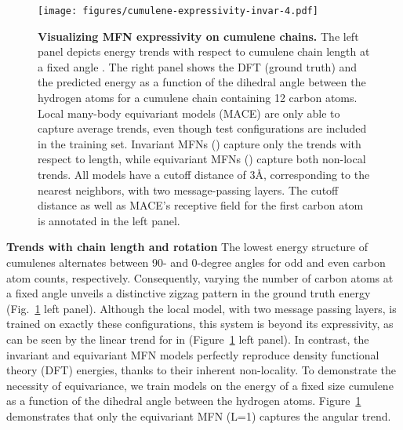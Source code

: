 \documentclass{article} \usepackage{iclr2024_conference,times}
\begin{document}
\begin{figure}[h!]
    \centering
    \vspace{-7pt}
    \texttt{[image: figures/cumulene-expressivity-invar-4.pdf]}
	\caption{\textbf{Visualizing MFN expressivity on cumulene chains.} The left panel depicts energy trends with respect to cumulene chain length at a fixed angle . The right panel shows the DFT (ground truth) and the predicted energy as a function of the dihedral angle  between the hydrogen atoms for a cumulene chain containing 12 carbon atoms. Local many-body equivariant models (MACE) are only able to capture average trends, even though test configurations are included in the training set. Invariant MFNs () capture only the trends with respect to length, while equivariant MFNs () capture both non-local trends. All models have a cutoff distance  of 3\AA{}, corresponding to the nearest neighbors, with two message-passing layers. The cutoff distance as well as MACE's receptive field for the first carbon atom is annotated in the left panel.}
    \label{fig:cumulenes-combined}
\end{figure}
\textbf{Trends with chain length and rotation}
The lowest energy structure of cumulenes alternates between 90- and 0-degree angles for odd and even carbon atom counts, respectively. Consequently, varying the number of carbon atoms at a fixed angle unveils a distinctive zigzag pattern in the ground truth energy (Fig.~\ref{fig:cumulenes-combined} left panel). Although the local model, with two message passing layers, is trained on exactly these configurations, this system is beyond its expressivity, as can be seen by the linear trend for  in (Figure~\ref{fig:cumulenes-combined} left panel). In contrast, the invariant and equivariant MFN models perfectly reproduce density functional theory (DFT) energies, thanks to their inherent non-locality. 
To demonstrate the necessity of equivariance, we train models on the energy of a fixed size cumulene as a function of the dihedral angle between the hydrogen atoms. Figure~\ref{fig:cumulenes-combined} demonstrates that only the equivariant MFN (L=1) captures the angular trend. 
\end{document}
